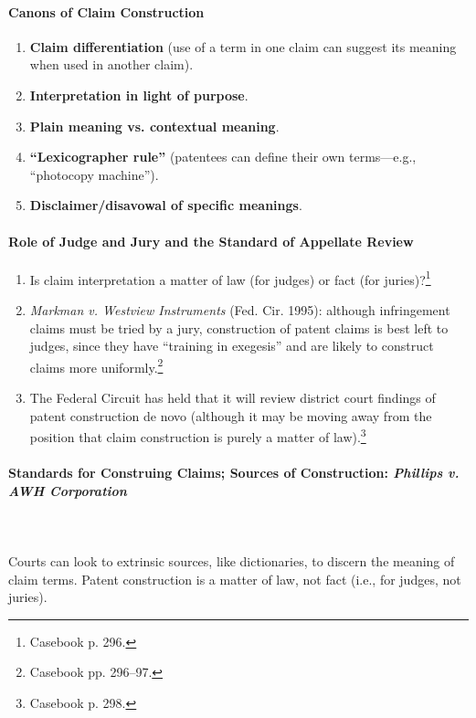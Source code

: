 \paragraph{Canons of Claim Construction}

\begin{enumerate}
    \item \textbf{Claim differentiation} (use of a term in one claim can 
    suggest its meaning when used in another claim).
    \item \textbf{Interpretation in light of purpose}.
    \item \textbf{Plain meaning vs. contextual meaning}.
    \item \textbf{``Lexicographer rule''} (patentees can define their own 
    terms---e.g., ``photocopy machine'').
    \item \textbf{Disclaimer/disavowal of specific meanings}.
\end{enumerate}

\paragraph{Role of Judge and Jury and the Standard of Appellate Review}

\begin{enumerate}
    \item Is claim interpretation a matter of law (for judges) or fact (for 
    juries)?\footnote{Casebook p. 296.}
    \item \emph{Markman v. Westview Instruments} (Fed. Cir. 1995): although 
    infringement claims must be tried by a jury, construction of patent claims 
    is best left to judges, since they have ``training in exegesis'' and are 
    likely to construct claims more uniformly.\footnote{Casebook pp. 296--97.}
    \item The Federal Circuit has held that it will review district court 
    findings of patent construction de novo (although it may be moving away from 
    the position that claim construction is purely a matter of 
    law).\footnote{Casebook p. 298.}
\end{enumerate}

\paragraph{Standards for Construing Claims; Sources of Construction: 
\emph{Phillips v. AWH Corporation}}
~\\\\
Courts can look to extrinsic sources, like dictionaries, to discern the 
meaning of claim terms. Patent construction is a matter of law, not fact 
(i.e., for judges, not juries).

